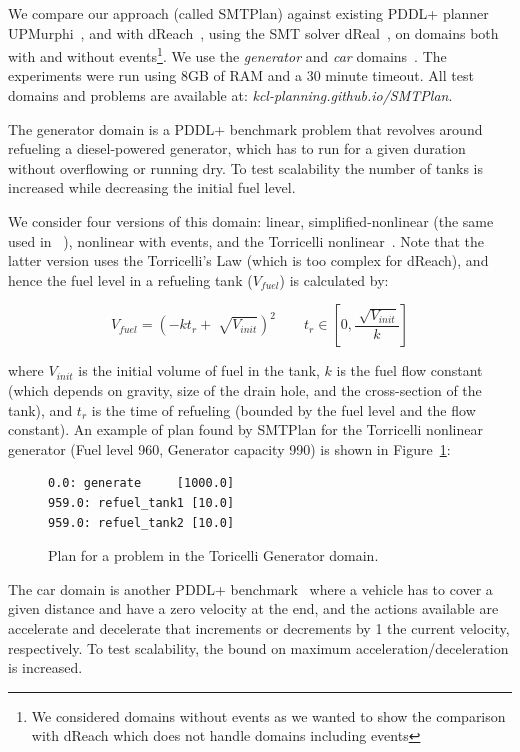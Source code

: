 We compare our approach (called SMTPlan) against existing PDDL+ planner UPMurphi~\cite{upmurphi}, and with dReach~\cite{bryce}, using the SMT solver dReal~\cite{gao12}, on domains both with and without events\footnote{We considered domains without events as we wanted to show the comparison with dReach which does not handle domains including events}. We use the \textit{generator} and \textit{car} domains~\cite{bogomolov14}. The experiments were run using 8GB of RAM and a 30 minute timeout. All test domains and problems are available at: \textit{kcl-planning.github.io/SMTPlan}.

The generator domain is a PDDL+ benchmark problem that revolves around refueling a diesel-powered generator, which has to run for a given duration without overflowing or running dry. To test scalability the number of tanks is increased while decreasing the initial fuel level.

We consider four versions of this domain: linear, simplified-nonlinear (the same used in ~\cite{bryce}), nonlinear with events, and the Torricelli nonlinear~\cite{howey2003val}. Note that the latter version uses the Torricelli's Law (which is too complex for dReach), and hence the fuel level in a refueling tank ($V_{fuel}$) is calculated by:

\begingroup\makeatletter{}\check@mathfonts
\begin{equation}
	V_{fuel} = (-kt_r+\sqrt[]{V_{init}})^2 \qquad t_r \in \left[0, \frac{\sqrt[]{V_{init}}}{k}\right] 
\end{equation}
\label{vol_eq}
\endgroup

where $V_{init}$ is the initial volume of fuel in the tank, $k$ is the fuel flow constant (which depends on gravity, size of the drain hole, and the cross-section of the tank), and $t_r$ is the time of refueling (bounded by the fuel level and the flow constant). An example of plan found by SMTPlan for the Torricelli nonlinear generator (Fuel level 960, Generator capacity 990) is shown in Figure~\ref{fig:generatorplan}:

\begin{figure}[htb!]
\centering
\small
\begin{BVerbatim}
0.0: generate     [1000.0]
959.0: refuel_tank1 [10.0]
959.0: refuel_tank2 [10.0]
\end{BVerbatim}
\caption{Plan for a problem in the Toricelli Generator domain.}
\label{fig:generatorplan}
\end{figure}

The car domain is another PDDL+ benchmark~\cite{pddl+} where a vehicle has to cover a given distance and have a zero velocity at the end, and the actions available are accelerate and decelerate that increments or decrements by 1 the current velocity, respectively.
To test scalability, the bound on maximum acceleration/deceleration is increased.

